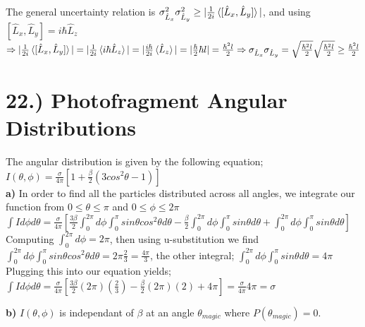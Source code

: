 \documentclass[12pt]{article}
\begin{document}
The general uncertainty relation is $\sigma_{\hat{L}_x}^2\sigma_{\hat{L}_y}^2\geq|\frac{1}{2i}\braket{[ \hat{L}_x,\hat{L}_y]}|$, and using $[\hat{L}_x,\hat{L}_y]=i\hbar\hat{L}_z$\\

$\Rightarrow|\frac{1}{2i}\braket{[ \hat{L}_x,\hat{L}_y]}|=|\frac{1}{2i}\braket{i\hbar\hat{L}_z}|=|\frac{i\hbar}{2i}\braket{\hat{L}_z}|=|\frac{\hbar}{2}\hbar l|=\frac{\hbar^2l}{2}\Rightarrow\sigma_{\hat{L}_x}\sigma_{\hat{L}_y}=\sqrt{ \frac{\hbar^2 l}{2}}\sqrt{ \frac{\hbar^2 l}{2}}\geq\frac{\hbar^2l}{2}$\\

\section*{22.) Photofragment Angular Distributions}
The angular distribution is given by the following equation; $I(\theta,\phi)=\frac{\sigma}{4\pi}[1+\frac{\beta}{2}(3cos^2\theta-1)]$\\

\textbf{a)} In order to find all the particles distributed across all angles, we integrate our function from $0\leq\theta\leq\pi$ and $0\leq\phi\leq 2\pi$\\

${\displaystyle\int}Id\phi d\theta=\frac{\sigma}{4\pi}[\frac{3\beta}{2}{\displaystyle\int_0^{2\pi}}d\phi{\displaystyle\int_0^{\pi}}sin\theta cos^2\theta d\theta-\frac{\beta}{2}{\displaystyle\int_0^{2\pi}}d\phi{\displaystyle\int_0^{\pi}}sin\theta d\theta +{\displaystyle\int_0^{2\pi}}d\phi{\displaystyle\int_0^{\pi}}sin\theta d\theta   ]$\\

Computing ${\displaystyle\int_0^{2\pi}}d\phi=2\pi$, then using u-substitution we find\\

${\displaystyle\int_0^{2\pi}}d\phi{\displaystyle\int_0^{\pi}}sin\theta cos^2\theta d\theta=2\pi\frac{2}{3}=\frac{4\pi}{3}$, the other integral; ${\displaystyle\int_0^{2\pi}}d\phi{\displaystyle\int_0^{\pi}}sin\theta d\theta=4\pi $ \\

Plugging this into our equation yields; ${\displaystyle\int}Id\phi
d\theta=\frac{\sigma}{4\pi}[\frac{3\beta}{2}(2\pi)(\frac{2}{3})-\frac{\beta}{2}(2\pi)(2)+4\pi]=\frac{\sigma}{4\pi}4\pi=\sigma$

\textbf{b)} $I(\theta,\phi)$ is independant of $\beta$ at an angle $\theta_{magic}$ where $P(\theta_{magic})=0$.\\
\end{document}
